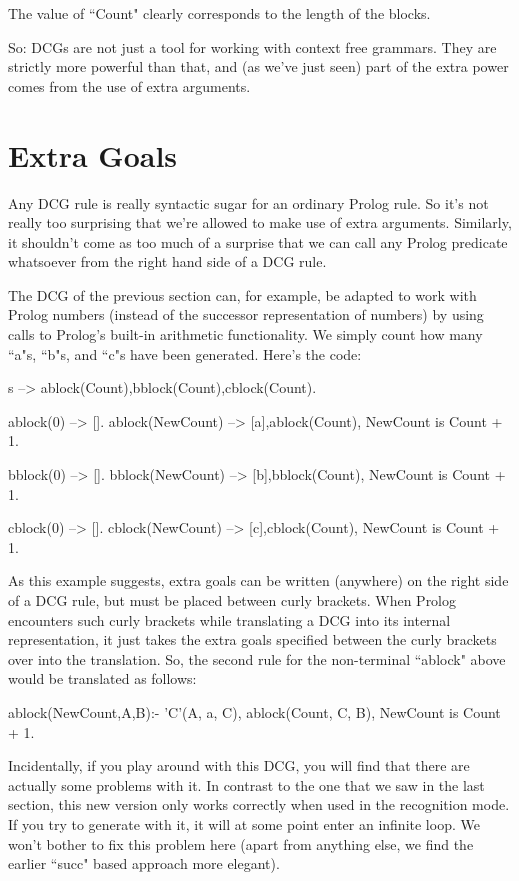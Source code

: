 The value of ``Count" clearly corresponds to the
length of the blocks.

 So: DCGs are not just a tool for working with context free
grammars. They are strictly more powerful than that, and (as we've
just seen) part of the extra power comes from the use of extra
arguments.

\section{Extra Goals}\label{SEC.L8.TESTS}



Any DCG rule is really syntactic sugar for an ordinary Prolog rule.
So it's not really too surprising that we're allowed to make use of
extra arguments.  Similarly, it shouldn't come as too much of a
surprise that we can call any Prolog predicate whatsoever from the
right hand side of a DCG rule.

The DCG of the previous section can, for example, be adapted to work
with Prolog numbers (instead of the successor representation of
numbers) by using calls to Prolog's built-in arithmetic
functionality. We simply count how many ``a"s, ``b"s, and ``c"s have been
generated. Here's the code:
\begin{LPNcodedisplay}
s --> ablock(Count),bblock(Count),cblock(Count).

ablock(0) --> [].
ablock(NewCount) --> [a],ablock(Count),
                     {NewCount is Count + 1}.

bblock(0) --> [].
bblock(NewCount) --> [b],bblock(Count),
                     {NewCount is Count + 1}.

cblock(0) --> [].
cblock(NewCount) --> [c],cblock(Count),
                     {NewCount is Count + 1}.
\end{LPNcodedisplay}

As this example suggests, extra goals can be written (anywhere) on the
right side of a DCG rule, but must be placed between curly
brackets. When Prolog encounters such curly brackets while translating
a DCG into its internal representation, it just takes the extra goals
specified between the curly brackets over into the translation. So,
the second rule for the non-terminal ``ablock" above would be
translated as follows:
\begin{LPNcodedisplay}
ablock(NewCount,A,B):-
   'C'(A, a, C),
   ablock(Count, C, B),
   NewCount is Count + 1.
\end{LPNcodedisplay}


Incidentally, if you play around with this DCG, you will find that
there are actually some problems with it. In contrast to the one that
we saw in the last section, this new version only works correctly when
used in the recognition mode. If you try to generate with it, it will
at some point enter an infinite loop. We won't bother to fix this
problem here (apart from anything else, we find the earlier ``succ"
based approach more elegant).

